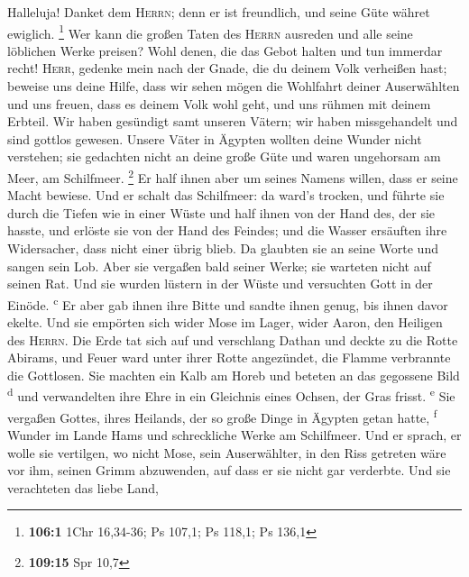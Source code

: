  Halleluja! Danket dem \textsc{Herrn}; denn er ist
freundlich, und seine Güte währet ewiglich. \footnote{\textbf{106:1}
  1Chr 16,34-36; Ps 107,1; Ps 118,1; Ps 136,1}  Wer kann
die großen Taten des \textsc{Herrn} ausreden und alle seine löblichen
Werke preisen?  Wohl denen, die das Gebot halten und tun
immerdar recht!  \textsc{Herr}, gedenke mein nach der
Gnade, die du deinem Volk verheißen hast; beweise uns deine Hilfe,
 dass wir sehen mögen die Wohlfahrt deiner Auserwählten
und uns freuen, dass es deinem Volk wohl geht, und uns rühmen mit deinem
Erbteil.  Wir haben gesündigt samt unseren Vätern; wir
haben missgehandelt und sind gottlos gewesen.  Unsere
Väter in Ägypten wollten deine Wunder nicht verstehen; sie gedachten
nicht an deine große Güte und waren ungehorsam am Meer, am Schilfmeer.
\footnote{\textbf{109:15} Spr 10,7}  Er half ihnen aber um
seines Namens willen, dass er seine Macht bewiese.  Und er
schalt das Schilfmeer: da ward's trocken, und führte sie durch die
Tiefen wie in einer Wüste  und half ihnen von der Hand
des, der sie hasste, und erlöste sie von der Hand des Feindes;
 und die Wasser ersäuften ihre Widersacher, dass nicht
einer übrig blieb.  Da glaubten sie an seine Worte und
sangen sein Lob.  Aber sie vergaßen bald seiner Werke;
sie warteten nicht auf seinen Rat.  Und sie wurden
lüstern in der Wüste und versuchten Gott in der Einöde.
\textsuperscript{c}  Er aber gab ihnen ihre Bitte und
sandte ihnen genug, bis ihnen davor ekelte.  Und sie
empörten sich wider Mose im Lager, wider Aaron, den Heiligen des
\textsc{Herrn}.  Die Erde tat sich auf und verschlang
Dathan und deckte zu die Rotte Abirams,  und Feuer ward
unter ihrer Rotte angezündet, die Flamme verbrannte die Gottlosen.
 Sie machten ein Kalb am Horeb und beteten an das
gegossene Bild \textsuperscript{d}  und verwandelten ihre
Ehre in ein Gleichnis eines Ochsen, der Gras frisst. \textsuperscript{e}
 Sie vergaßen Gottes, ihres Heilands, der so große Dinge
in Ägypten getan hatte, \textsuperscript{f}  Wunder im
Lande Hams und schreckliche Werke am Schilfmeer.  Und er
sprach, er wolle sie vertilgen, wo nicht Mose, sein Auserwählter, in den
Riss getreten wäre vor ihm, seinen Grimm abzuwenden, auf dass er sie
nicht gar verderbte.  Und sie verachteten das liebe Land,
